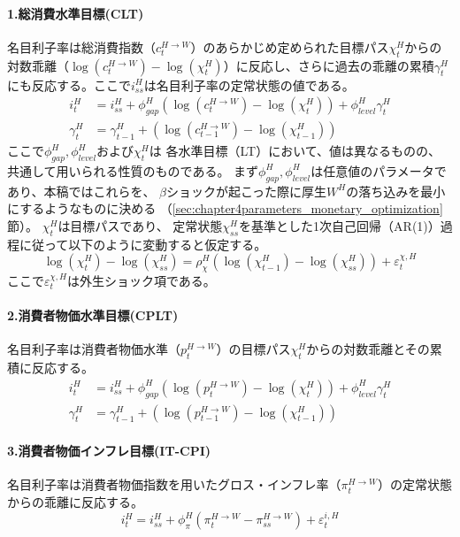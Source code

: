 \paragraph{1.総消費水準目標(CLT)}
\label{sec:chapter3_policies_monetary_home_clt}
名目利子率は総消費指数（\(c_t^{H\to W}\)）のあらかじめ定められた目標パス\(\chi_t^H\)からの対数乖離（\(\log(c_t^{H\to W})-\log(\chi_t^H)\)）に反応し、さらに過去の乖離の累積\(\gamma_t^H\)にも反応する。ここで\(i_{ss}^H\)は名目利子率の定常状態の値である。
\begin{align}
\label{form:chapter3_policies_monetary_home_clt_i_H_eq}
    i_t^H&=i_{ss}^H+\phi_{gap}^H(\log(c_t^{H\to W})-\log(\chi_t^H))+\phi_{level}^H\gamma_t^H \\
\label{form:chapter3_policies_monetary_home_clt_gamma_H_eq}
    \gamma_t^H&=\gamma_{t-1}^H+(\log(c_{t-1}^{H\to W})-\log(\chi_{t-1}^H))
\end{align}
ここで\(\phi_{gap}^H, \phi_{level}^H\)および\(\chi_t^H\)は
各水準目標（LT）において、値は異なるものの、共通して用いられる性質のものである。
まず\(\phi_{gap}^H, \phi_{level}^H\)は任意値のパラメータであり、本稿ではこれらを、
\(\beta\)ショックが起こった際に厚生\(W^H\)の落ち込みを最小にするようなものに決める
（\ref{sec:chapter4parameters_monetary_optimization}節）。
\(\chi_t^H\)は目標パスであり、
定常状態\(\chi_{ss}^H\)を基準とした1次自己回帰（AR(1)）過程に従って以下のように変動すると仮定する。
\begin{equation}
\label{form:chapter3_policies_monetary_home_clt_chi_H_eq}
    \log(\chi_t^H)-\log(\chi_{ss}^H)=\rho_{\chi}^H\left(\log(\chi_{t-1}^H)-\log(\chi_{ss}^H)\right)+\varepsilon_t^{\chi,H}
\end{equation}
ここで\(\varepsilon_t^{\chi,H}\)は外生ショック項である。
\paragraph{2.消費者物価水準目標(CPLT)}
\label{sec:chapter3_policies_monetary_home_cplt}
名目利子率は消費者物価水準（\(p_t^{H\to W}\)）の目標パス\(\chi_t^H\)からの対数乖離とその累積に反応する。
\begin{align}
\label{form:chapter3_policies_monetary_home_cplt_i_H_eq}
    i_t^H&=i_{ss}^H+\phi_{gap}^H(\log(p_t^{H\to W})-\log(\chi_t^H))+\phi_{level}^H\gamma_t^H \\
\label{form:chapter3_policies_monetary_cplt_gamma_H_eq}
    \gamma_t^H&=\gamma_{t-1}^H+(\log(p_{t-1}^{H\to W})-\log(\chi_{t-1}^H))
\end{align}

\paragraph{3.消費者物価インフレ目標(IT-CPI)}
\label{sec:chapter3_policies_monetary_home_it_cpi}
名目利子率は消費者物価指数を用いたグロス・インフレ率（\(\pi_t^{H\to W}\)）の定常状態からの乖離に反応する。
\begin{equation}
\label{form:chapter3_policies_monetary_home_it_cpi_i_H_eq}
    i_t^H=i_{ss}^H+\phi_{\pi}^H(\pi_t^{H\to W}-\pi_{ss}^{H\to W})+\varepsilon_t^{i,H}
\end{equation}

